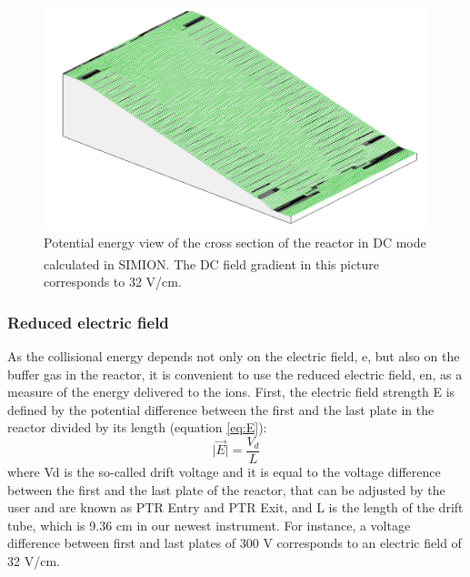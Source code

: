 \begin{figure}%
\centering
\includegraphics[width=0.8\linewidth]{pics/DC_SIMION.PNG}
\centering
\caption{Potential energy view of the cross section of the reactor in DC mode calculated in SIMION\textsuperscript{\textregistered}. The DC field gradient in this picture corresponds to 32 V/cm.}
\label{fig:dt_simion}
\end{figure}

\subsubsection{Reduced electric field}
As the collisional energy depends not only on the electric field, \acrshort{e}, but also on the buffer gas in the reactor, it is convenient to use the reduced electric field, \acrshort{en}, as a measure of the energy delivered to the ions. First, the electric field strength E is defined by the potential difference between the first and the last plate in the reactor divided by its length (equation \ref{eq:E}):
\begin{equation}
\lvert\vec{E}\rvert = \frac{V_d}{L}
\label{eq:E}
\end{equation}
where \acrshort{Vd} is the so-called drift voltage and it is equal to the voltage difference between the first and the last plate of the reactor, that can be adjusted by the user and are known as PTR Entry and PTR Exit, and L is the length of the drift tube, which is 9.36 cm in our newest instrument. For instance, a voltage difference between first and last plates of 300 V corresponds to an electric field of 32 V/cm.

